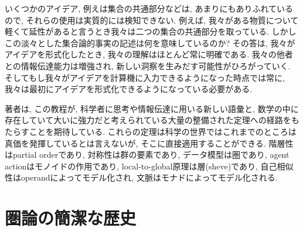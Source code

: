 いくつかのアイデア, 例えは集合の共通部分などは, あまりにもありふれているので, それらの使用は実質的には検知できない. 例えば, 我々がある物質について軽くて延性があると言うとき我々は二つの集合の共通部分を取っている. しかしこの淡々とした集合論的事実の記述は何を意味しているのか? その答は, 我々がアイデアを形式化したとき, 我々の理解はほとんど常に明確である. 我々の他者との情報伝達能力は増強され, 新しい洞察を生みだす可能性がひろがっていく. そしてもし我々がアイデアを計算機に入力できるようになった時点では常に, 我々は最初にアイデアを形式化できるようになっている必要がある.


著者は, この教程が, 科学者に思考や情報伝達に用いる新しい語彙と, 数学の中に存在していて大いに強力だと考えられている大量の整備された定理への経路をもたらすことを期待している. これらの定理は科学の世界ではこれまでのところは真価を発揮しているとは言えないが, そこに直接適用することができる. 階層性はpartial orderであり, 対称性は群の要素であり, データ模型は圏であり, agent actionはモノイドの作用であり, local-to-global原理は層(sheve)であり, 自己相似性はoperandによってモデル化され, 文脈はモナドによってモデル化される.



\section{圏論の簡潔な歴史}


